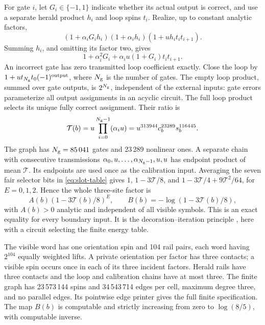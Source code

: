 For gate \(i\), let \(G_i\in\{-1,1\}\) indicate whether its actual output is correct, and use a separate herald product \(h_i\) and loop spins \(t_i\). Realize, up to constant analytic factors,
\[
 (1+\alpha_iG_ih_i)(1+\alpha_ih_i)(1+u h_it_it_{i+1}).
\]
Summing \(h_i\), and omitting its factor two, gives
\begin{equation}\label{eq:herald-identity}
 1+\alpha_i^2G_i+\alpha_i u(1+G_i)t_it_{i+1}.
\end{equation}
An incorrect gate has zero transmitted loop coefficient exactly. Close the loop by \(1+ut_{N_{\rm g}}t_0(-1)^{\mathrm{output}}\), where \(N_{\rm g}\) is the number of gates. The empty loop product, summed over gate outputs, is \(2^{N_{\rm g}}\), independent of the external inputs: gate errors parameterize all output assignments in an acyclic circuit. The full loop product selects its unique fully correct assignment. Their ratio is
\[
 \mathcal T(b)=u\prod_{i=0}^{N_{\rm g}-1}(\alpha_i u)
 =u^{313944}c_b^{23289}s_b^{116445}.
\]
The graph has \(N_{\rm g}=85\,041\) gates and 23\,289 nonlinear ones. A separate chain with consecutive transmissions \(\alpha_0,u,\ldots,\alpha_{N_{\rm g}-1},u,u\) has endpoint product of mean \(\mathcal T\). Its endpoints are used once as the calibration input. Averaging the seven fair selector bits in \eqref{eq:slot-table} gives \(1\), \(1-3\mathcal T/8\), and \(1-3\mathcal T/4+9\mathcal T^2/64\), for \(E=0,1,2\). Hence the whole three-site factor is
\begin{equation}\label{eq:parent-map}
 A(b)(1-3\mathcal T(b)/8)^E,\qquad
 B(b)=-\log(1-3\mathcal T(b)/8),
\end{equation}
with \(A(b)>0\) analytic and independent of all visible symbols. This is an exact equality for every boundary input. It is the decoration--iteration principle \cite{fisher}, here with a circuit selecting the finite energy table.

The visible word has one orientation spin and 104 rail pairs, each word having \(2^{104}\) equally weighted lifts. A private orientation per factor has three contacts; a visible spin occurs once in each of its three incident factors. Herald rails have three contacts and the loop and calibration chains have at most three. The finite graph has 23\,573\,144 spins and 34\,543\,714 edges per cell, maximum degree three, and no parallel edges. Its pointwise edge printer gives the full finite specification. The map \(B(b)\) is computable and strictly increasing from zero to \(\log(8/5)\), with computable inverse.

